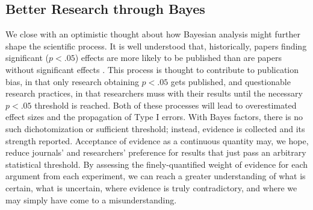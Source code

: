 \documentclass[man]{apa6}
\begin{document}
\subsection{Better Research through Bayes}
We close with an optimistic thought about how Bayesian analysis might further shape the scientific process. It is well understood that, historically, papers finding significant ($p < .05$) effects are more likely to be published than are papers without significant effects \citep{Cooper:etal:1997,Atkinson:etal:1982}. This process is thought to contribute to publication bias, in that only research obtaining $p<.05$ gets published, and questionable research practices, in that researchers muss with their results until the necessary $p < .05$ threshold is reached. Both of these processes will lead to overestimated effect sizes and the propagation of Type I errors. %
With Bayes factors, there is no such dichotomization or sufficient threshold; instead, evidence is collected and its strength reported. Acceptance of evidence as a continuous quantity may, we hope, reduce journals' and researchers' preference for results that just pass an arbitrary statistical threshold. By assessing the finely-quantified weight of evidence for each argument from each experiment, we can reach a greater understanding of what is certain, what is uncertain, where evidence is truly contradictory, and where we may simply have come to a misunderstanding.


\end{document}

